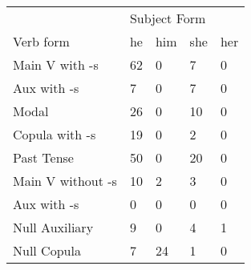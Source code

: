 \begin{table}[]
\begin{minipage}{0.5\textwidth}
\end{minipage}
\begin{minipage}{0.5\textwidth}
    \centering
    \begin{tabular}{@{}lllll@{}}
        \toprule
            &\multicolumn{4}{l}{Subject Form}\\
            \cline{2-5}
        Verb form & he & him & she & her \\
        \midrule
        Main V with -s & 62 & 0 & 7 & 0 \\
        Aux with -s & 7 & 0 & 7 & 0 \\
        Modal & 26 & 0 & 10 & 0 \\
        Copula with -s & 19 & 0 & 2 & 0 \\
        Past Tense & 50 & 0 & 20 & 0 \\
        \hline
        Main V without -s & 10 & 2 & 3 & 0 \\
        Aux with -s & 0 & 0 & 0 & 0 \\
        Null Auxiliary & 9 & 0 & 4 & 1 \\
        Null Copula & 7 & 24 & 1 & 0 \\
        \bottomrule
    \end{tabular}
    \end{minipage}
\end{table}
